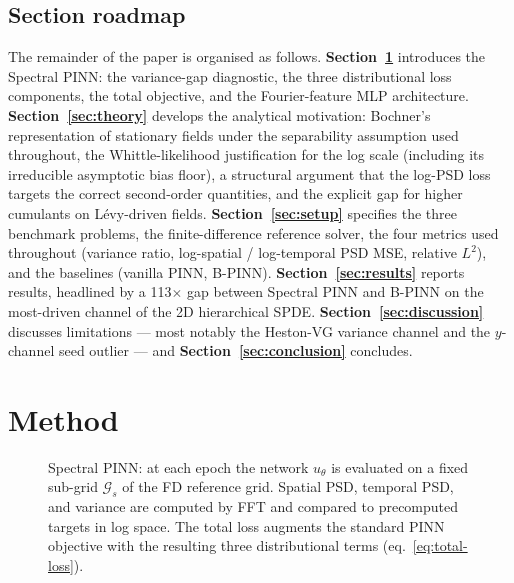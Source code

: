 \documentclass[review,12pt]{elsarticle}
\begin{document}
\subsection{Section roadmap}
\label{subsec:roadmap}

The remainder of the paper is organised as follows.
\textbf{Section~\ref{sec:method}} introduces the Spectral PINN: the
variance-gap diagnostic, the three distributional loss components,
the total objective, and the Fourier-feature MLP architecture.
\textbf{Section~\ref{sec:theory}} develops the analytical
motivation: Bochner's representation of stationary fields under the
separability assumption used throughout, the Whittle-likelihood
justification for the log scale (including its irreducible
asymptotic bias floor), a structural argument that the log-PSD loss
targets the correct second-order quantities, and the explicit gap
for higher cumulants on L\'evy-driven fields.
\textbf{Section~\ref{sec:setup}} specifies the three benchmark
problems, the finite-difference reference solver, the four metrics
used throughout (variance ratio, log-spatial / log-temporal PSD
MSE, relative \(L^2\)), and the baselines (vanilla PINN, B-PINN).
\textbf{Section~\ref{sec:results}} reports results, headlined by a
113\(\times\) gap between Spectral PINN and B-PINN on the
most-driven channel of the 2D hierarchical SPDE.
\textbf{Section~\ref{sec:discussion}} discusses limitations ---
most notably the Heston-VG variance channel and the \(y\)-channel
seed outlier --- and \textbf{Section~\ref{sec:conclusion}}
concludes.

\section{Method}
\label{sec:method}

\begin{figure}[t]
  \centering
  \caption{Spectral PINN: at each epoch the network $u_\theta$ is
  evaluated on a fixed sub-grid $\mathcal{G}_s$ of the FD reference
  grid. Spatial PSD, temporal PSD, and variance are computed by FFT
  and compared to precomputed targets in log space. The total loss
  augments the standard PINN objective with the resulting three
  distributional terms (eq.~\ref{eq:total-loss}).}
  \label{fig:method-schematic}
\end{figure}
\end{document}
